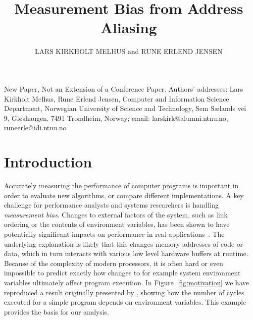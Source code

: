 \documentclass[prodmode,acmtaco]{acmsmall}
\title{Measurement Bias from Address Aliasing}
\author{
LARS KIRKHOLT MELHUS and RUNE ERLEND JENSEN
  \affil{Norwegian University of Science and Technology}}
\begin{document}
\begin{bottomstuff}
New Paper, Not an Extension of a Conference Paper.
Authors' addresses: Lars Kirkholt Melhus, Rune Erlend Jensen, Computer and Information Science Department, Norwegian University of Science and Technology, 
Sem S{\ae}lands vei 9, Gl{\o}shaugen, 7491 Trondheim, Norway; email: larskirk@alumni.ntnu.no, runeerle@idi.ntnu.no
\end{bottomstuff}

\maketitle


\section{Introduction}
Accurately measuring the performance of computer programs is important in order to evaluate new algorithms, or compare different implementations.
A key challenge for performance analysts and systems researchers is handling \emph{measurement bias}.
Changes to external factors of the system, such as link ordering or the contents of environment variables, has been shown to have potentially significant impacts on performance in real applications~\cite{Mytkowicz:2009:WrongData}.
The underlying explanation is likely that this changes memory addresses of code or data, which in turn interacts with various low level hardware buffers at runtime.
Because of the complexity of modern processors, it is often hard or even impossible to predict exactly how changes to for example system environment variables ultimately affect program execution.
In Figure~\ref{fig:motivation} we have reproduced a result originally presented by , showing how the number of cycles executed for a simple program depends on environment variables.
This example provides the basis for our analysis.
\end{document}
